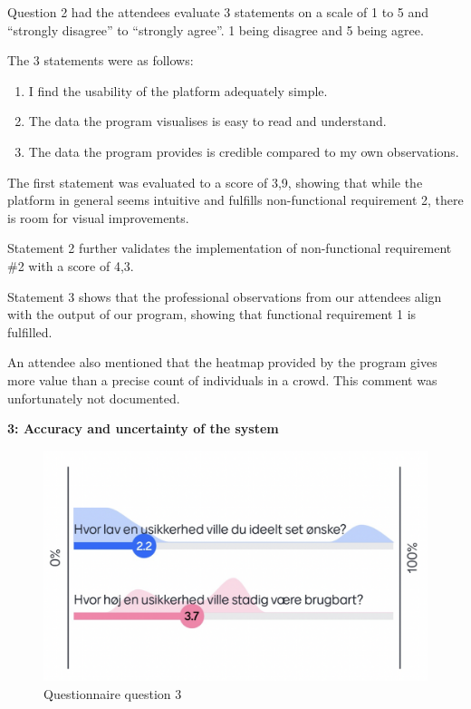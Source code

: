 \documentclass[
]{article}
\begin{document}
Question 2 had the attendees evaluate 3 statements on a scale of 1 to 5
and ``strongly disagree'' to ``strongly agree''. 1 being disagree and 5
being agree.

The 3 statements were as follows:

\begin{enumerate}
\def\labelenumi{\arabic{enumi}.}
\item
  I find the usability of the platform adequately simple.
\item
  The data the program visualises is easy to read and understand.
\item
  The data the program provides is credible compared to my own
  observations.
\end{enumerate}

The first statement was evaluated to a score of 3,9, showing that while
the platform in general seems intuitive and fulfills non-functional
requirement 2, there is room for visual improvements.

Statement 2 further validates the implementation of non-functional
requirement \#2 with a score of 4,3.

Statement 3 shows that the professional observations from our attendees
align with the output of our program, showing that functional
requirement 1 is fulfilled.

An attendee also mentioned that the heatmap provided by the program
gives more value than a precise count of individuals in a crowd. This
comment was unfortunately not documented.

\textbf{3: Accuracy and uncertainty of the system}\\

\begin{figure}

{\centering \includegraphics{../images/Evaluation_question3.png}

}

\caption{\label{fig-evaluation_question_3}Questionnaire question 3}

\end{figure}
\end{document}
